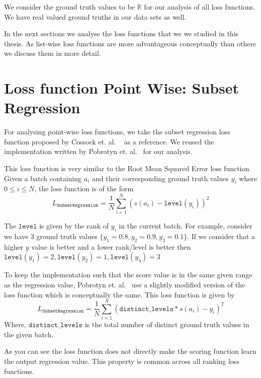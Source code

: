 \documentclass[12pt, twoside, ngerman]{report}
\begin{document}
We consider the ground truth values to be $\mathbb{R}$ for our analysis of all loss functions.
We have real valued ground truths in our data sets as well.

In the next sections we analyse the loss functions that we we studied in this thesis.
As list-wise loss functions are more advantageous conceptually than others we discuss them in more detail.

\section{Loss function Point Wise: Subset Regression}

For analysing point-wise loss functions,  we take the subset regression loss function proposed by Cossock et. al. ~\cite{subsetregressionpaper} as a reference.
We reused the implementation written by Pobrotyn et. al.~\cite{Pobrotyn2020ContextAwareLT} for our analysis.

This loss function is very similar to the Root Mean Squared Error loss function.
Given a batch containing $a_i$ and their corresponding ground truth values $y_i$ where $0 \leq i \leq N$,  the loss function is of the form
\begin{equation}
L_{\texttt{SubsetRegression}} = \frac{1}{N} \sum\limits_{i=1}^{N} (s(a_i) - \texttt{level}(y_i))^2
\end{equation}

The $\texttt{level}$ is given by the rank of $y_i$ in the current batch.
For example,  consider we have 3 ground truth values $\{y_1 = 0.8, y_2 = 0.9, y_3 = 0.1\}$.
If we consider that a higher $y$ value is better and a lower rank/level is better then 
$\texttt{level}(y_1) = 2,  \texttt{level}(y_2) = 1,  \texttt{level}(y_3) = 3$

To keep the implementation such that the score value is in the same given range as the regression value,  Pobrotyn et. al.~\cite{Pobrotyn2020ContextAwareLT} use a slightly modified version of the loss function which is conceptually the same.
This loss function is given by
\begin{equation}
L_{\texttt{SubsetRegression}} = \frac{1}{N} \sum\limits_{i=1}^{N} (\texttt{distinct\_levels} * s(a_i) - y_i)^2
\end{equation}
Where,  $\texttt{distinct\_levels}$ is the total number of distinct ground truth values in the given batch.

As you can see the loss function does not directly make the scoring
function learn the output regression value.
This property is common across all ranking loss functions.
\end{document}
